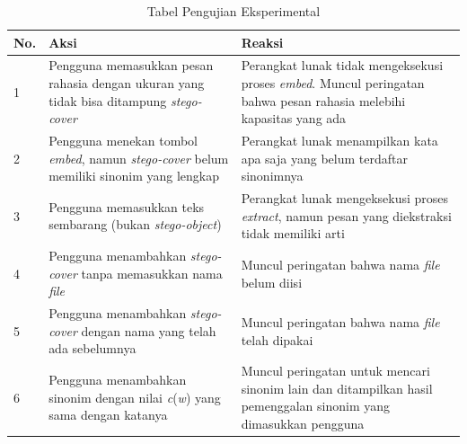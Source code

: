 \begin{table}[H]
\label{table-eksperimental}
\centering
\caption{Tabel Pengujian Eksperimental}
\begin{tabular}{|p{0.3cm} | p{5.5cm} | p{7.5cm} |}\hline
No. & Aksi & Reaksi \\
\hline
1 & Pengguna memasukkan pesan rahasia dengan ukuran yang tidak bisa ditampung \textit{stego-cover} & Perangkat lunak tidak mengeksekusi proses \textit{embed}. Muncul peringatan bahwa pesan rahasia melebihi kapasitas yang ada\\
2 & Pengguna menekan tombol \textit{embed}, namun \textit{stego-cover} belum memiliki sinonim yang lengkap & Perangkat lunak menampilkan kata apa saja yang belum terdaftar sinonimnya\\
3 & Pengguna memasukkan teks sembarang (bukan \textit{stego-object}) & Perangkat lunak mengeksekusi proses \textit{extract}, namun pesan yang diekstraksi tidak memiliki arti\\
4 & Pengguna menambahkan \textit{stego-cover} tanpa memasukkan nama \textit{file} & Muncul peringatan bahwa nama \textit{file} belum diisi\\
5 & Pengguna menambahkan \textit{stego-cover} dengan nama yang telah ada sebelumnya & Muncul peringatan bahwa nama \textit{file} telah dipakai\\
6 & Pengguna menambahkan sinonim dengan nilai \textit{c}(\textit{w}) yang sama dengan katanya & Muncul peringatan untuk mencari sinonim lain dan ditampilkan hasil pemenggalan sinonim yang dimasukkan pengguna\\
\hline
\end{tabular}
\end{table}